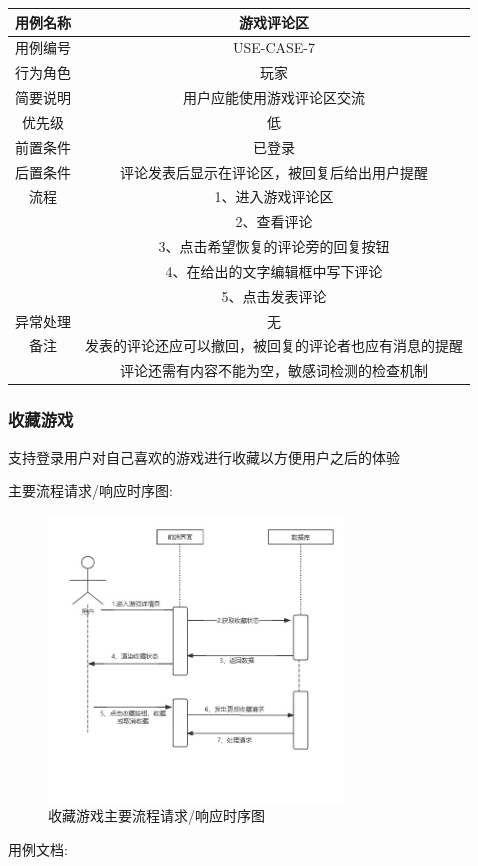 \documentclass[12pt]{ctexart} %
\begin{document}
\begin{tabular}{|c|c|}
  \hline
  用例名称& 游戏评论区\\
  \hline
  用例编号 & USE-CASE-7\\
  \hline
  行为角色 & 玩家\\
  \hline
  简要说明 & 用户应能使用游戏评论区交流\\
  \hline
  优先级 & 低\\
  \hline
  前置条件 & 已登录\\
  \hline
  后置条件 & 评论发表后显示在评论区，被回复后给出用户提醒\\
  \hline
  流程 & 1、进入游戏评论区\\
      &  2、查看评论\\
      &  3、点击希望恢复的评论旁的回复按钮\\
      &  4、在给出的文字编辑框中写下评论\\
      &  5、点击发表评论\\
  \hline
  异常处理 & 无\\
  \hline
  备注 & 发表的评论还应可以撤回，被回复的评论者也应有消息的提醒\\
       & 评论还需有内容不能为空，敏感词检测的检查机制\\
  \hline
\end{tabular}

\subsubsection{收藏游戏}
支持登录用户对自己喜欢的游戏进行收藏以方便用户之后的体验

主要流程请求/响应时序图:
\begin{figure}[ht]
  \centering
  \includegraphics[width=0.7\textwidth]{yongli8.jpg}
  \caption{收藏游戏主要流程请求/响应时序图}
\end{figure}
用例文档:
\end{document}
